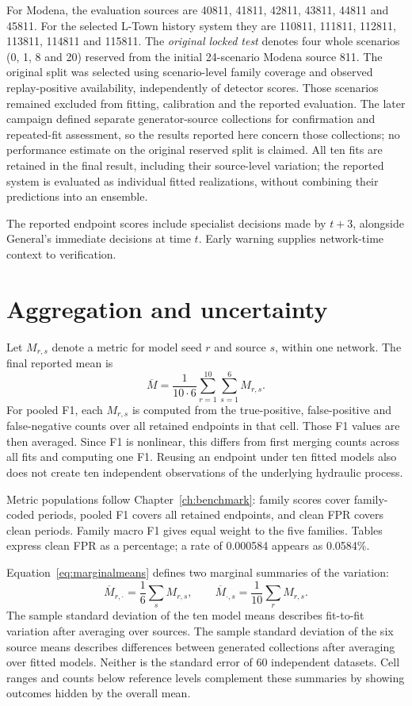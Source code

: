 For Modena, the evaluation sources are 40811, 41811, 42811, 43811, 44811 and 45811. For the selected L-Town history system they are 110811, 111811, 112811, 113811, 114811 and 115811. The \emph{original locked test} denotes four whole scenarios (0, 1, 8 and 20) reserved from the initial 24-scenario Modena source 811. The original split was selected using scenario-level family coverage and observed replay-positive availability, independently of detector scores. Those scenarios remained excluded from fitting, calibration and the reported evaluation. The later campaign defined separate generator-source collections for confirmation and repeated-fit assessment, so the results reported here concern those collections; no performance estimate on the original reserved split is claimed. All ten fits are retained in the final result, including their source-level variation; the reported system is evaluated as individual fitted realizations, without combining their predictions into an ensemble.

The reported endpoint scores include specialist decisions made by $t+3$, alongside General's immediate decisions at time $t$. Early warning supplies network-time context to verification.

\section{Aggregation and uncertainty}
Let $M_{r,s}$ denote a metric for model seed $r$ and source $s$, within one network. The final reported mean is
\begin{equation}
 \overline M=\frac{1}{10\cdot6}\sum_{r=1}^{10}\sum_{s=1}^{6}M_{r,s}.
 \label{eq:cellmean}
\end{equation}
For pooled F1, each $M_{r,s}$ is computed from the true-positive, false-positive and false-negative counts over all retained endpoints in that cell. Those F1 values are then averaged. Since F1 is nonlinear, this differs from first merging counts across all fits and computing one F1. Reusing an endpoint under ten fitted models also does not create ten independent observations of the underlying hydraulic process.

Metric populations follow Chapter~\ref{ch:benchmark}: family scores cover family-coded periods, pooled F1 covers all retained endpoints, and clean FPR covers clean periods. Family macro F1 gives equal weight to the five families. Tables express clean FPR as a percentage; a rate of 0.000584 appears as 0.0584\%.

Equation~\eqref{eq:marginalmeans} defines two marginal summaries of the variation:
\begin{equation}
 \overline M_{r,\cdot}=\frac{1}{6}\sum_s M_{r,s},\qquad
 \overline M_{\cdot,s}=\frac{1}{10}\sum_r M_{r,s}.
 \label{eq:marginalmeans}
\end{equation}
The sample standard deviation of the ten model means describes fit-to-fit variation after averaging over sources. The sample standard deviation of the six source means describes differences between generated collections after averaging over fitted models. Neither is the standard error of 60 independent datasets. Cell ranges and counts below reference levels complement these summaries by showing outcomes hidden by the overall mean.

